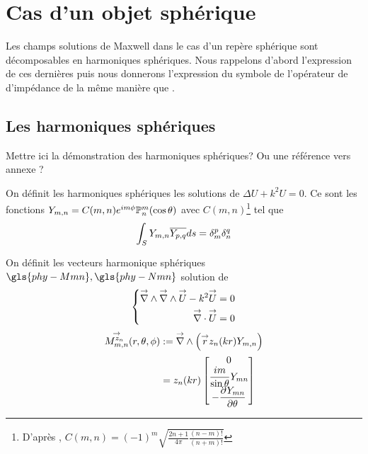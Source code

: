 \section{Cas d'un objet sphérique}

    Les champs solutions de Maxwell dans le cas d'un repère sphérique sont décomposables en harmoniques sphériques. Nous rappelons d'abord l’expression de ces dernières puis nous donnerons l'expression du symbole de l'opérateur de d'impédance de la même manière que \cite{cheng_spectral_1993}.

    \subsection{Les harmoniques sphériques}

        \begin{TODO}
          Mettre ici la démonstration des harmoniques sphériques? Ou une référence vers annexe ?
        \end{TODO}

        On définit les harmoniques sphériques les solutions de \(\Delta U + k^2 U = 0 \). Ce sont les fonctions \(Y_{m,n} = C(m,n) e^{im\phi}\mathbb{P}^m_n(\cos \theta) \) avec \(C(m,n)\)\footnote{D’après \cite[p.~24]{nedelec_acoustic_2001}, \( C(m,n) = (-1)^m\sqrt{\frac{2n+1}{4\pi}\frac{(n-m)!}{(n+m)!}}\)} tel que
        \[
         \displaystyle\int_S Y_{m,n} {\overline{Y_{p,q}}} ds = \delta_m^p \delta_n^q
        \]


        On définit les vecteurs harmonique sphériques\(\gls{phy-Mmn} ,\gls{phy-Nmn}\) solution de 
        \[
            \left\lbrace
                \begin{aligned}
                    {\overset{\rightarrow}{\nabla}}\wedge {\overset{\rightarrow}{\nabla}}\wedge {\overset{\rightarrow}{U}} - k^2 {\overset{\rightarrow}{U}} = 0\\
                    {\overset{\rightarrow}{\nabla}}\cdot {\overset{\rightarrow}{U}} = 0
                \end{aligned}
            \right.
        \]
        \begin{align}
            \label{eq:defMmn}
            \Mmn[z_n](\rtp) &:= \vrot \left( \vect{r} z_n(kr) Y_{m,n} \right)\\
            &= z_n(kr)
            \begin{bmatrix}
                0 
                \\
                \frac{im}{\sin\theta}Y_{mn}
                \\
                - \ddr{\theta}{Y_{mn}}
            \end{bmatrix}
        \end{align}

